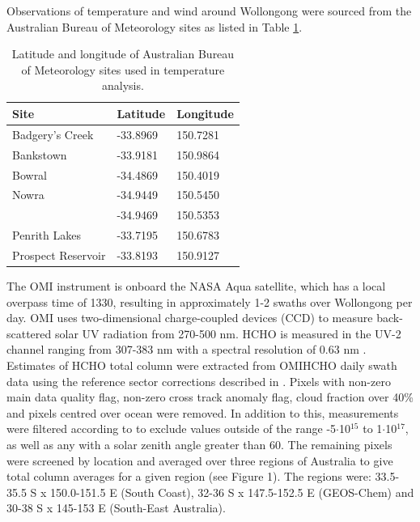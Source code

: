 \documentclass[draft]{agujournal}
\begin{document}
Observations of temperature and wind around Wollongong were sourced from the Australian Bureau of Meteorology sites as listed in Table \ref{tab:sites}.

\begin{table}
\begin{center}
\begin{tabular}{ | l | l | l | }
  \hline
  \textbf{Site} & \textbf{Latitude} & \textbf{Longitude} \\  \hline
  Badgery's Creek & -33.8969 & 150.7281 \\  \hline
  Bankstown & -33.9181 & 150.9864 \\  \hline
  Bowral & -34.4869 & 150.4019 \\  \hline
  Nowra & -34.9449 & 150.5450 \\
   & -34.9469 & 150.5353 \\  \hline
  Penrith Lakes & -33.7195 & 150.6783 \\  \hline
  Prospect Reservoir & -33.8193 & 150.9127 \\  \hline
\end{tabular}
\caption{Latitude and longitude of Australian Bureau of Meteorology sites used in temperature analysis.}
\label{tab:sites}
\end{center}
\end{table}

The OMI instrument is onboard the NASA Aqua satellite, which has a local overpass time of 1330, resulting in approximately 1-2 swaths over Wollongong per day. OMI uses two-dimensional charge-coupled devices (CCD) to measure back-scattered solar UV radiation from 270-500 nm. HCHO is measured in the UV-2 channel ranging from 307-383 nm with a spectral resolution of 0.63 nm \citep{Gonzalez2015}. Estimates of HCHO total column were extracted from OMIHCHO daily swath data using the reference sector corrections described in \citet{Gonzalez2015}. Pixels with non-zero main data quality flag, non-zero cross track anomaly flag, cloud fraction over 40\% and pixels centred over ocean were removed. In addition to this, measurements were  filtered according to \citet{Zhu2016} to exclude values outside of the range -5$\cdot$10$^{15}$ to 1$\cdot$10$^{17}$, as well as any with a solar zenith angle greater than 60\degree. The remaining pixels were screened by location and averaged over three regions of Australia to give total column averages for a given region (see Figure 1). The regions were: 33.5-35.5 \degree S x 150.0-151.5 \degree E (South Coast), 32-36 \degree S x 147.5-152.5 \degree E (GEOS-Chem) and 30-38 \degree S x 145-153 \degree E (South-East Australia).
\end{document}
